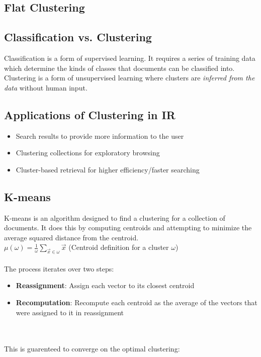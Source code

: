 \documentclass{article}%
\begin{document}
\begin{enumerate}
\begin{enumerate}
\begin{enumerate}
\section*{Flat Clustering}
\subsection*{Classification vs. Clustering}
Classification is a form of supervised learning. It requires a series of training data which determine the
kinds of classes that documents can be classified into. Clustering is a form of unsupervised learning where
clusters are \textit{inferred from the data} without human input.
\subsection*{Applications of Clustering in IR}
\begin{itemize}
    \item Search results to provide more information to the user
    \item Clustering collections for exploratory browsing
    \item Cluster-based retrieval for higher efficiency/faster searching
\end{itemize}
\subsection*{K-means}
K-means is an algorithm designed to find a clustering for a collection of documents. It does this by computing
centroids and attempting to minimize the average squared distance from the centroid.\\

$\mu(\omega) = \frac{1}{\omega} \sum \limits_{\vec{x} \in \omega} \vec{x}$ \hfill (Centroid definition for a cluster $\omega$)\\
\\
The process iterates over two steps:
\begin{itemize}
    \item \textbf{Reassignment}: Assign each vector to its closest centroid
    \item \textbf{Recomputation}: Recompute each centroid as the average of the vectors that were assigned to it in reassignment
\end{itemize}\\
\\
This is guarenteed to converge on the optimal clustering:
\end{enumerate}
\end{enumerate}
\end{enumerate}
\end{document}
